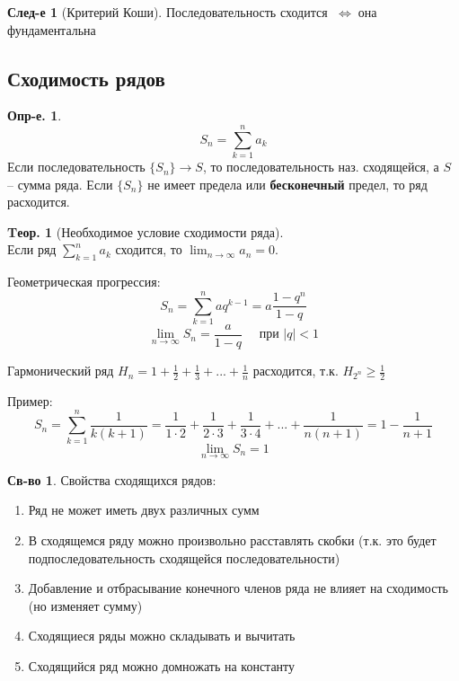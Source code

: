 \documentclass[a4paper,12pt]{article}
\numberwithin{figure}{section}
\theoremstyle{definition}
\newtheorem{definition}{Опр-е.}[section]
\newtheorem*{property}{Св-во}  %
\theoremstyle{definition}
\newtheorem{theorem}{Tеор.}[section]
\newtheorem*{corollary}{След-е} %
\def\DS{\displaystyle}
\def\ntoinf{n \to \infty}
\def\geqs{\geqslant}
\def\iff {$\;\Longleftrightarrow\;$}
\begin{document}
\begin{corollary}[Критерий Коши]
	Последовательность сходится \iff она фундаментальна
\end{corollary}


\subsection{Сходимость рядов}

\begin{definition}
	\[ S_n = \sum_{k=1}^n a_k \]
	Если последовательность $\{S_n\} \to S$, то последовательность наз. сходящейся, а $S$ -- сумма ряда. Если $\{S_n\}$ не имеет предела или \textbf{бесконечный} предел, то ряд расходится.
\end{definition}

\begin{theorem}[Необходимое условие сходимости ряда] \ \\
	Если ряд $\DS \sum_{k=1}^n a_k$ сходится,
	то $\DS \lim_{\ntoinf}a_n = 0$.
\end{theorem}

Геометрическая прогрессия:
	\[ S_n = \sum_{k=1}^n aq^{k-1} = a\frac{1-q^n}{1-q} \]
	\[ \lim_{\ntoinf}S_n = \frac{a}{1-q} \quad \text{ при } |q|<1 \]

Гармонический ряд $\DS H_n = 1 + \frac12 + \frac13 + ... + \frac1n$
расходится, т.к. $\DS H_{2^n} \geqs \frac12$

\bigbreak
Пример:
\[ S_n = \sum_{k=1}^n \frac1{k(k+1)}
       = \frac1{1\cdot2} + \frac1{2\cdot3} + \frac1{3\cdot4} + ... + \frac1{n(n+1)}
       = 1 - \frac1{n+1} \]
\[ \lim_{\ntoinf}S_n = 1 \]

\begin{property} Свойства сходящихся рядов:
  \begin{enumerate}
	\item Ряд не может иметь двух различных сумм
	\item В сходящемся ряду можно произвольно расставлять скобки
		  (т.к. это будет подпоследовательность сходящейся последовательности)
	\item Добавление и отбрасывание конечного членов ряда не влияет на сходимость (но изменяет сумму)
	\item Сходящиеся ряды можно складывать и вычитать
	\item Сходящийся ряд можно домножать на константу
  \end{enumerate}
\end{property}
\end{document}
